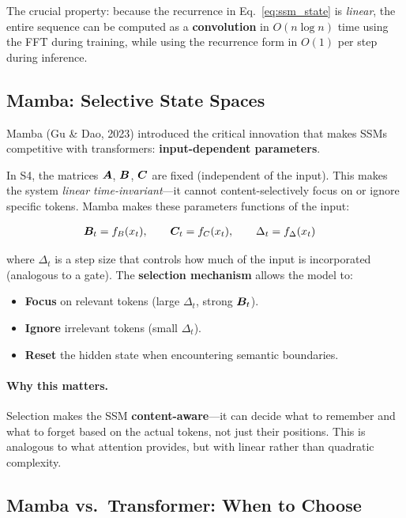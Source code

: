 The crucial property: because the recurrence in Eq.~\eqref{eq:ssm_state} is
\emph{linear}, the entire sequence can be computed as a \textbf{convolution}
in $O(n \log n)$ time using the FFT during training, while using the
recurrence form in $O(1)$ per step during inference.

\subsection{Mamba: Selective State Spaces}

Mamba (Gu \& Dao, 2023) introduced the critical innovation that makes SSMs
competitive with transformers: \textbf{input-dependent parameters}.

In S4, the matrices $\bm{A}$, $\bm{B}$, $\bm{C}$ are fixed (independent of the input).
This makes the system \emph{linear time-invariant}---it cannot
content-selectively focus on or ignore specific tokens.  Mamba makes these
parameters functions of the input:

\begin{align}
\bm{B}_t &= f_B(x_t), \qquad \bm{C}_t = f_C(x_t), \qquad \Delta_t = f_\Delta(x_t)
\label{eq:mamba_selective}
\end{align}

where $\Delta_t$ is a step size that controls how much of the input is
incorporated (analogous to a gate).  The \textbf{selection mechanism} allows
the model to:
\begin{itemize}[leftmargin=*]
\item \textbf{Focus} on relevant tokens (large $\Delta_t$, strong $\bm{B}_t$).
\item \textbf{Ignore} irrelevant tokens (small $\Delta_t$).
\item \textbf{Reset} the hidden state when encountering semantic boundaries.
\end{itemize}

\paragraph{Why this matters.}
Selection makes the SSM \textbf{content-aware}---it can decide what to
remember and what to forget based on the actual tokens, not just their
positions.  This is analogous to what attention provides, but with linear
rather than quadratic complexity.

\subsection{Mamba vs.\ Transformer: When to Choose}

